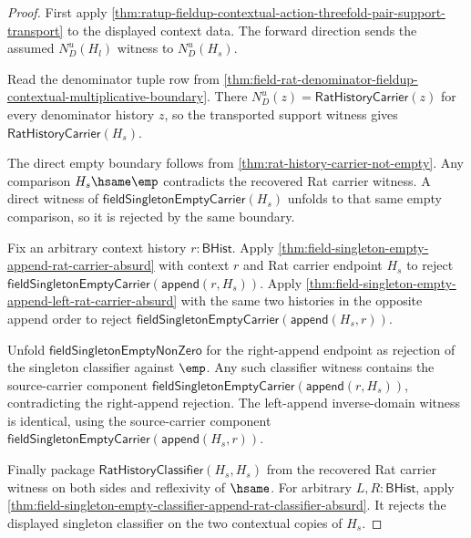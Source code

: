 \begin{proof}
First apply
\autoref{thm:ratup-fieldup-contextual-action-threefold-pair-support-transport}
to the displayed context data. The forward direction sends the assumed
$N_D^u(H_l)$ witness to $N_D^u(H_s)$.

Read the denominator tuple row from
\autoref{thm:field-rat-denominator-fieldup-contextual-multiplicative-boundary}.
There $N_D^u(z)=\mathsf{RatHistoryCarrier}(z)$ for every denominator history
$z$, so the transported support witness gives
$\mathsf{RatHistoryCarrier}(H_s)$.

The direct empty boundary follows from
\autoref{thm:rat-history-carrier-not-empty}. Any comparison
$H_s\hsame\emp$ contradicts the recovered Rat carrier witness. A direct witness
of $\mathsf{fieldSingletonEmptyCarrier}(H_s)$ unfolds to that same empty
comparison, so it is rejected by the same boundary.

Fix an arbitrary context history $r:\mathsf{BHist}$. Apply
\autoref{thm:field-singleton-empty-append-rat-carrier-absurd} with context $r$
and Rat carrier endpoint $H_s$ to reject
$\mathsf{fieldSingletonEmptyCarrier}(\mathsf{append}(r,H_s))$. Apply
\autoref{thm:field-singleton-empty-append-left-rat-carrier-absurd} with the
same two histories in the opposite append order to reject
$\mathsf{fieldSingletonEmptyCarrier}(\mathsf{append}(H_s,r))$.

Unfold $\mathsf{fieldSingletonEmptyNonZero}$ for the right-append endpoint as
rejection of the singleton classifier against $\emp$. Any such classifier
witness contains the source-carrier component
$\mathsf{fieldSingletonEmptyCarrier}(\mathsf{append}(r,H_s))$, contradicting
the right-append rejection. The left-append inverse-domain witness is identical,
using the source-carrier component
$\mathsf{fieldSingletonEmptyCarrier}(\mathsf{append}(H_s,r))$.

Finally package $\mathsf{RatHistoryClassifier}(H_s,H_s)$ from the recovered Rat
carrier witness on both sides and reflexivity of $\hsame$. For arbitrary
$L,R:\mathsf{BHist}$, apply
\autoref{thm:field-singleton-empty-classifier-append-rat-classifier-absurd}.
It rejects the displayed singleton classifier on the two contextual copies of
$H_s$.
\end{proof}

